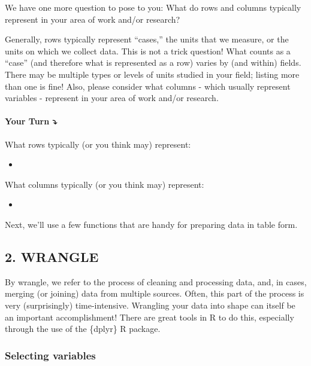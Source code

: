 \documentclass[
]{article}
\providecommand{\tightlist}{%
  \setlength{\itemsep}{0pt}\setlength{\parskip}{0pt}}
\begin{document}
We have one more question to pose to you: What do rows and columns
typically represent in your area of work and/or research?

Generally, rows typically represent ``cases,'' the units that we
measure, or the units on which we collect data. This is not a trick
question! What counts as a ``case'' (and therefore what is represented
as a row) varies by (and within) fields. There may be multiple types or
levels of units studied in your field; listing more than one is fine!
Also, please consider what columns - which usually represent variables -
represent in your area of work and/or research.

\hypertarget{your-turn-1}{%
\paragraph{\texorpdfstring{{\textbf{Your Turn}}
\textbf{⤵}}{Your Turn ⤵}}\label{your-turn-1}}

What rows typically (or you think may) represent:

\begin{itemize}
\tightlist
\item
\end{itemize}

What columns typically (or you think may) represent:

\begin{itemize}
\tightlist
\item
\end{itemize}

Next, we'll use a few functions that are handy for preparing data in
table form.

\hypertarget{wrangle}{%
\subsection{2. WRANGLE}\label{wrangle}}

By wrangle, we refer to the process of cleaning and processing data,
and, in cases, merging (or joining) data from multiple sources. Often,
this part of the process is very (surprisingly) time-intensive.
Wrangling your data into shape can itself be an important
accomplishment! There are great tools in R to do this, especially
through the use of the \{dplyr\} R package.

\hypertarget{selecting-variables}{%
\subsubsection{Selecting variables}\label{selecting-variables}}
\end{document}
